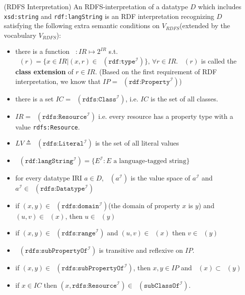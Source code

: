\documentclass{article}
\DeclareMathOperator{\IEXT}{I_{EXT}}
\DeclareMathOperator{\ICEXT}{I_{CEXT}}
\newcommand{\deno}[1]{{\texttt{#1}}^{\mathcal{I}}}
\begin{document}
\begin{defin}(RDFS Interpretation)\newline
An RDFS-interpretation of a datatype $D$ which includes \texttt{xsd:string} and \texttt{rdf:langString} is an RDF interpretation recognizing $D$ satisfying the following extra semantic conditions on $V_{RDFS}$(extended by the vocabulary $V_{RDFS}$):
\begin{itemize}
\item there is a function $\ICEXT:IR \mapsto 2^{IR}$ s.t. $\ICEXT(r) = \{x \in IR | (x,r) \in \IEXT(\texttt{rdf:type}^{\mathcal{I}})\},\,\forall r \in IR$. $\ICEXT(r)$ is called the \textbf{class extension} of $r \in IR$. (Based on the first requirement of RDF interpretation, we know that $IP = \ICEXT(\deno{rdf:Property})$)

\item there is a set $IC = \ICEXT(\texttt{rdfs:Class}^{\mathcal{I}})$, i.e. $IC$ is the set of all classes. 

\item $IR = \ICEXT(\texttt{rdfs:Resource}^{\mathcal{I}})$ i.e. every resource has a property type with a value \texttt{rdfs:Resource}.
\item $LV \triangleq \ICEXT(\texttt{rdfs:Literal}^{\mathcal{I}})$ is the set of all literal values
\item $\ICEXT(\texttt{rdf:langString}^{\mathcal{I}}) =  \{E^{\mathcal{I}} : E \text{ a language-tagged string} \}$

\item for every datatype IRI $a\in D$, $\ICEXT(a^{\mathcal{I}})$ is the value space of $a^{\mathcal{I}}$ and $a^{\mathcal{I}} \in \ICEXT(\texttt{rdfs:Datatype}^{\mathcal{I}})$

\item if $(x,y) \in \IEXT(\deno{rdfs:domain})$(the domain of property $x$ is $y$) and $(u,v) \in \IEXT(x)$, then $u \in \ICEXT(y)$

\item if $(x,y) \in \IEXT(\deno{rdfs:range})$ and $(u,v) \in \IEXT(x)$ then $v \in \ICEXT(y)$ 

\item $\IEXT(\deno{rdfs:subPropertyOf})$ is transitive and reflexive on $IP$. 
\item if $(x,y) \in \IEXT(\deno{rdfs:subPropertyOf})$, then $x,y \in IP$ and $\IEXT(x) \subset \IEXT(y)$

\item if $x \in IC$ then $(x,\deno{rdfs:Resource})\in \IEXT(\deno{subClassOf})$. 


\end{itemize}
\end{defin}
\end{document}
